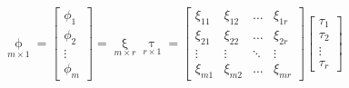 \begin{equation}
    \mathop{\phi }\limits_{m\times 1} =\begin{bmatrix}
        \phi _1\\\phi _2\\\vdots\\\phi _m
    \end{bmatrix} 
    =\mathop{\xi }\limits_{m\times r} \mathop{\tau}\limits_{r\times 1}  =
    \begin{bmatrix}
    \xi _{11}&\xi _{12}&\ldots&\xi _{1r}\\
    \xi _{21}&\xi _{22}&\ldots&\xi _{2r}\\
    \vdots&\vdots&\ddots&\vdots\\
    \xi _{m1}&\xi _{m2}&\ldots&\xi _{mr}
    \end{bmatrix}\begin{bmatrix}
        \tau_1\\\tau_2\\\vdots\\\tau_r
    \end{bmatrix}
\end{equation}


